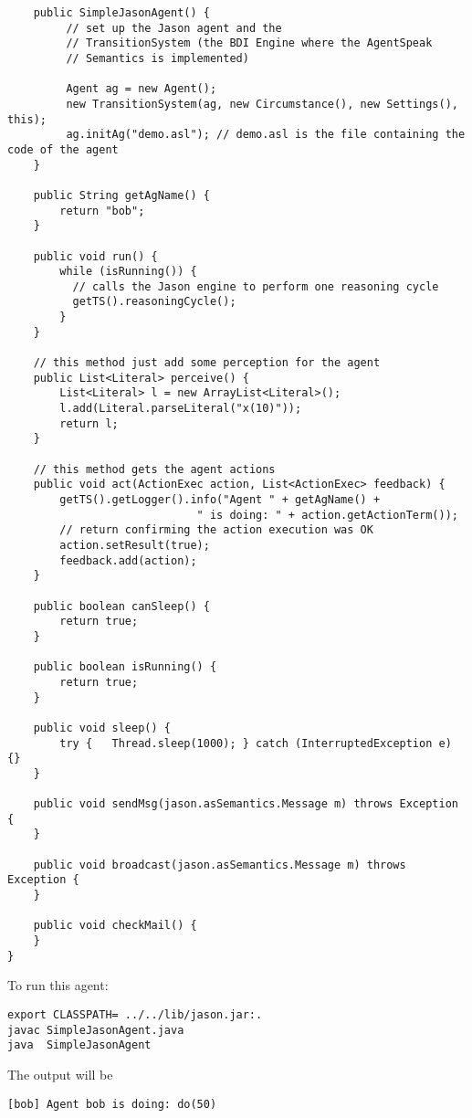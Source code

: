 \documentclass{article}
\begin{document}
\begin{description}
\begin{verbatim}
    public SimpleJasonAgent() {
         // set up the Jason agent and the 
         // TransitionSystem (the BDI Engine where the AgentSpeak 
         // Semantics is implemented)

         Agent ag = new Agent();
         new TransitionSystem(ag, new Circumstance(), new Settings(), this);
         ag.initAg("demo.asl"); // demo.asl is the file containing the code of the agent
    }
    
    public String getAgName() {
        return "bob";
    }

    public void run() {
        while (isRunning()) {
          // calls the Jason engine to perform one reasoning cycle
          getTS().reasoningCycle();
        }
    }

    // this method just add some perception for the agent
    public List<Literal> perceive() {
        List<Literal> l = new ArrayList<Literal>();
        l.add(Literal.parseLiteral("x(10)"));
        return l;
    }

    // this method gets the agent actions
    public void act(ActionExec action, List<ActionExec> feedback) {
        getTS().getLogger().info("Agent " + getAgName() + 
                             " is doing: " + action.getActionTerm());
        // return confirming the action execution was OK
        action.setResult(true);
        feedback.add(action);
    }

    public boolean canSleep() {
        return true;
    }

    public boolean isRunning() {
        return true;
    }

    public void sleep() {
    	try {   Thread.sleep(1000); } catch (InterruptedException e) {}
    }
    
    public void sendMsg(jason.asSemantics.Message m) throws Exception {
    }

    public void broadcast(jason.asSemantics.Message m) throws Exception {
    }

    public void checkMail() {
    }
}
\end{verbatim}

To run this agent:
\begin{verbatim}
export CLASSPATH= ../../lib/jason.jar:.
javac SimpleJasonAgent.java
java  SimpleJasonAgent
\end{verbatim}

The output will be 
\begin{verbatim}
[bob] Agent bob is doing: do(50)
\end{verbatim}


\end{description}
\end{document}
